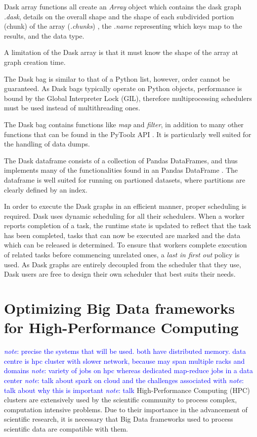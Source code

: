 \documentclass{report}
\newcommand{\note}[1]{\textcolor{blue}{\textit{note}: #1}}
\begin{document}
        Dask array functions all create an \textit{Array} object which contains 
        the dask graph \textit{.dask}, details on the overall shape and the 
        shape of each subdivided portion (chunk) of the array (\textit{.chunks})
        , the \textit{.name} representing which keys map to the results, and the
        data type.

        A limitation of the Dask array is that it must know the shape of the 
        array at graph creation time.

        The Dask bag is similar to that of a Python list, however, order cannot 
        be guaranteed. As Dask bags typically operate on Python objects, 
        performance is bound by the Global Interpreter Lock (GIL), therefore 
        multiprocessing schedulers must be used instead of multithreading ones.

        The Dask bag contains functions like \textit{map} and \textit{filter}, 
        in addition to many other functions that can be found in the PyToolz API
        . It is particularly well suited for the handling of data dumps.

        The Dask dataframe consists of a collection of Pandas DataFrames, and 
        thus implements many of the functionalities found in an Pandas DataFrame
        . The dataframe is well suited for running on partioned datasets, where 
        partitions are clearly defined by an index.

        In order to execute the Dask graphs in an efficient manner, proper 
        scheduling is required. Dask uses dynamic scheduling for all their 
        schedulers. When a worker reports completion of a task, the runtime 
        state is updated to reflect that the task has been completed, tasks that
        can now be executed are marked and the data which can be released is 
        determined. To ensure that workers complete execution of related tasks 
        before commencing unrelated ones, a \textit{last in first out} policy is
        used. As Dask graphs are entirely decoupled from the scheduler that they
        use, Dask users are free to design their own scheduler that best suits 
        their needs.


\chapter{Optimizing Big Data frameworks for High-Performance Computing}
	
    \note{precise the systems that will be used. both have distributed memory.
    data centre is hpc cluster with slower network, because may span multiple
    racks and domains} \note{variety of jobs on hpc whereas dedicated map-reduce
    jobs in a data center} \note{talk about spark on cloud and the challenges
    associated with} \note{talk about why this is important} \note{talk }
    High-Performance Computing (HPC) clusters are extensively used by the
    scientific community to process complex, computation intensive problems. Due
    to their importance in the advancement of scientific research, it is
    necessary that Big Data frameworks used to process scientific data are
    compatible with them. 
	
\end{document}
